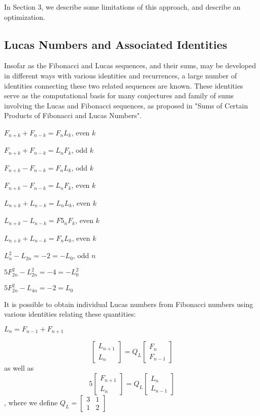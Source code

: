 \documentclass[11pt]{article}
\begin{document}
In Section 3, we describe some limitations of this approach, and describe an optimization.

\subsection{Lucas Numbers and Associated Identities}
Insofar as the Fibonacci and Lucas sequences, and their sums, may be developed in different ways with various identities and recurrences, a large number of identities connecting these two related sequences are known. These identities serve as the computational basis for many conjectures and family of sums involving the Lucas and Fibonacci sequences, as proposed in "Sums of Certain Products of Fibonacci and Lucas Numbers".

$F_{n+k} + F_{n-k} = F_{n}L_{k}$, even $k$

$F_{n+k} + F_{n-k} = L_{n}F_{k}$, odd $k$

$F_{n+k} - F_{n-k} = F_{n}L_{k}$, odd $k$

$F_{n+k} - F_{n-k} = L_{n}F_{k}$, even $k$

$L_{n+k} + L_{n-k} = L_{n}L_{k}$, even $k$

$L_{n+k} - L_{n-k}= F5_{n}F_{k}$, even $k$

$L_{n+k} + L_{n-k} = F_{n}L_{k}$, even $k$

$L_{n}^{2} - L_{2n} = -2 = -L_{0}$, odd $n$

$5F_{2n}^{2} - L_{2n}^{2} = -4 = -L_{0}^{2}$

$5F_{2n}^{2} - L_{4n} = -2 = L_{0}$

It is possible to obtain individual Lucas numbers from Fibonacci numbers using various identities relating these quantities:

$L_{n} = F_{n-1} + F_{n+1}$

\[
\begin{bmatrix}
L_{n+1} \\
L_{n}
\end{bmatrix} = Q_{L} \begin{bmatrix} F_{n} \\ F_{n-1}\end{bmatrix}
\] 
as well as
\[
5\begin{bmatrix}
F_{n+1} \\
L_{n}
\end{bmatrix} = Q_{L} \begin{bmatrix} L_{n} \\ L_{n-1}\end{bmatrix}
\] , where we define $Q_{L} = \begin{bmatrix} 3 & 1 \\ 1 & 2 \end{bmatrix}$
\end{document}
